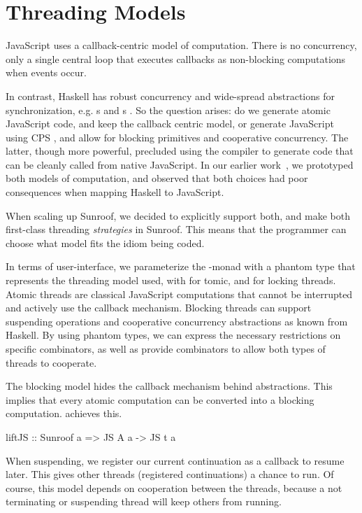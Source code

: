  
\section{Threading Models}
\label{sec:threading-models}

JavaScript uses a callback-centric model of computation. There
is no concurrency, only a single central loop that executes
callbacks as non-blocking computations when events occur.

In contrast, Haskell has robust concurrency and wide-spread 
abstractions for synchronization, e.g. s and s
\cite{Jones:96:ConcurrentHaskell}.
So the question arises: do we generate atomic JavaScript code, 
and keep the callback centric model, or generate JavaScript
using CPS \cite{Claessen:99:PoorMansConcurrencyMonad}, 
and allow for blocking primitives and
cooperative concurrency. The latter, though more powerful, 
precluded using the compiler to generate
code that can be cleanly called from native JavaScript.
In our earlier work~\cite{...}, we prototyped both models
of computation, and observed that both choices had poor consequences
when mapping Haskell to JavaScript.

When scaling up Sunroof, we decided to explicitly support both,
and make both first-class threading {\em strategies\/} in Sunroof.
This means that the programmer can choose what model fits
the idiom being coded.

In terms of user-interface, we parameterize the \JS-monad
with a phantom type that represents the threading model used, 
with  for tomic,
and  for locking threads. 
Atomic threads are classical JavaScript computations that
cannot be interrupted and actively use the callback
mechanism. Blocking threads can
support suspending operations and cooperative concurrency
abstractions as known from Haskell. By using phantom
types, we can express the necessary
restrictions on specific combinators, as well
as provide combinators to allow both types of
threads to cooperate.

The blocking model hides the callback mechanism behind abstractions.
This implies that every atomic computation can be converted into 
a blocking computation.  achieves this.
\begin{Code}
liftJS :: Sunroof a => JS A a -> JS t a
\end{Code}

When suspending, we register our current
continuation as a callback to resume later. This gives other 
threads (registered continuations) a chance to run.
Of course, this model depends on cooperation between the threads,
because a not terminating or suspending thread will keep others from running.

